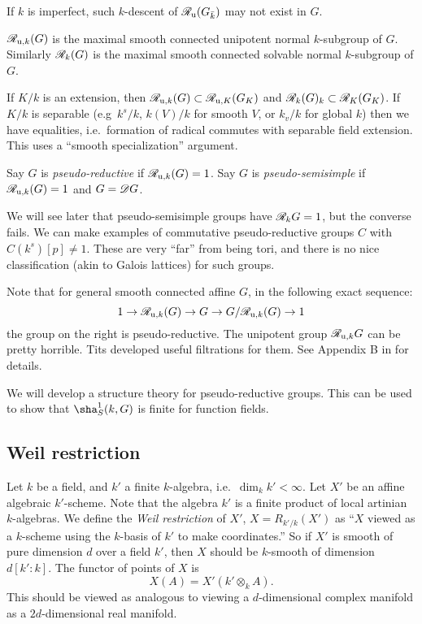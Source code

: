 If $k$ is imperfect, such $k$-descent of $\mathscr{R}_{\mathrm{u}}(G_{\bar k})$ may not exist 
in $G$. 

\begin{defi}
$\mathscr{R}_{\mathrm{u},k}(G)$ is the maximal smooth connected unipotent normal $k$-subgroup of 
$G$. Similarly $\mathscr{R}_k(G)$ is the maximal smooth connected solvable normal 
$k$-subgroup of $G$. 
\end{defi}

If $K/k$ is an extension, then $\mathscr{R}_{\mathrm{u},k}(G)\subset \mathscr{R}_{\mathrm{u},K}(G_K)$ and 
$\mathscr{R}_k(G)_k\subset \mathscr{R}_K(G_K)$. If $K/k$ is separable (e.g~$k^s/k$, 
$k(V)/k$ for smooth $V$, or $k_v/k$ for global $k$) then we have equalities, 
i.e.\ formation of radical commutes with separable field extension. This uses 
a ``smooth specialization'' argument. 

\begin{defi}
Say $G$ is \emph{pseudo-reductive} if $\mathscr{R}_{\mathrm{u},k}(G)=1$. Say $G$ is 
\emph{pseudo-semisimple} if $\mathscr{R}_{\mathrm{u},k}(G)=1$ and $G=\mathscr{D} G$. 
\end{defi}
We will see later that pseudo-semisimple groups have $\mathscr{R}_k G=1$, but the 
converse fails. We can make examples of commutative pseudo-reductive groups 
$C$ with $C(k^s)[p]\ne 1$. These are very ``far'' from being tori, and there 
is no nice classification (akin to Galois lattices) for such groups. 

Note that for general smooth connected affine $G$, in the following exact sequence:
\[
  1 \to \mathscr{R}_{\mathrm{u},k}(G) \to G \to G/\mathscr{R}_{\mathrm{u},k}(G) \to 1
\]
the group on the right is pseudo-reductive. The unipotent group 
$\mathscr{R}_{\mathrm{u},k} G$ can be pretty horrible. Tits developed useful filtrations for 
them. See Appendix B in \cite{cgp10} for details. 

We will develop a structure theory for pseudo-reductive groups. This can 
be used to show that $\sha_S^1(k,G)$ is finite for function fields. 





\subsection{Weil restriction}

Let $k$ be a field, and $k'$ a finite $k$-algebra, i.e.~$\dim_k k'<\infty$. Let 
$X'$ be an affine algebraic $k'$-scheme. Note that the algebra $k'$ is a finite 
product of local artinian $k$-algebras. We define the \emph{Weil restriction} 
of $X'$, $X=R_{k'/k}(X')$ as ``$X$ viewed as a $k$-scheme using the $k$-basis of 
$k'$ to make coordinates.'' So if $X'$ is smooth of pure dimension $d$ over a 
field $k'$, then $X$ should be $k$-smooth of dimension $d[k':k]$. The 
functor of points of $X$ is 
\[
  X(A) = X'(k'\otimes_k A) .
\]
This should be viewed as analogous to viewing a $d$-dimensional complex 
manifold as a $2d$-dimensional real manifold. 

